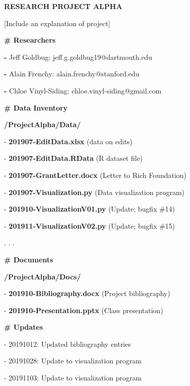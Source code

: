 \begin{center}
\begin{tcolorbox}[colframe=oyster, coltitle=black, sharp corners, title=README.md]

\textbf{RESEARCH PROJECT ALPHA}

\medskip

[Include an explanation of project]

\medskip

\textbf{\# Researchers}

\textbf{-} Jeff Goldbug: {\color{green}jeff.g.goldbug19@dartmouth.edu}

\textbf{-} Alain Frenchy: {\color{green}alain.frenchy@stanford.edu}

\textbf{-} Chloe Vinyl-Siding: {\color{green}chloe.vinyl-siding@gmail.com}

\medskip

\textbf{\# Data Inventory}

\smallskip

{\color{green}\textbf{/ProjectAlpha/Data/}}

- \textbf{201907-EditData.xlsx} (data on edits)

- \textbf{201907-EditData.RData} (R dataset file)

- \textbf{201907-GrantLetter.docx} (Letter to Rich Foundation)

- \textbf{201907-Visualization.py} (Data visualization program)

- \textbf{201910-VisualizationV01.py} (Update; bugfix \#14)

- \textbf{201911-VisualizationV02.py} (Update; bugfix \#15)

. . . \medskip

\textbf{\# Documents}

{\color{green}\textbf{/ProjectAlpha/Docs/}}

- \textbf{201910-Bibliography.docx} (Project bibliography)

- \textbf{201910-Presentation.pptx} (Class presentation)

\medskip

\textbf{\# Updates}

- 20191012: Updated bibliography entries

- 20191028: Update to visualization program

- 20191103: Update to visualization program

\end{tcolorbox}

\end{center}

